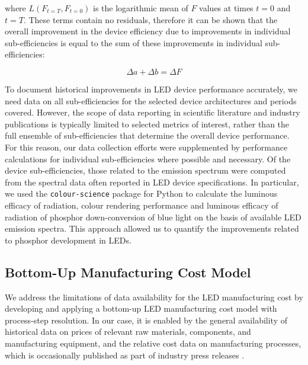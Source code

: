 \documentclass[journal=jacsat,manuscript=article]{achemso}
\begin{document}
where $L(F_{t=T}, F_{t=0})$ is the logarithmic mean of $F$ values at times $t=0$ and $t=T$. These terms contain no residuals, therefore it can be shown that the overall improvement in the device efficiency due to improvements in individual sub-efficiencies is equal to the sum of these improvements in individual sub-efficiencies: 

\begin{equation}
    \Delta a + \Delta b  = \Delta F
\end{equation}

To document historical improvements in LED device performance accurately, we need data on all sub-efficiencies for the selected device architectures and periods covered. However, the scope of data reporting in scientific literature and industry publications is typically limited to selected metrics of interest, rather than the full ensemble of sub-efficiencies that determine the overall device performance. For this reason, our data collection efforts were supplemented by performance calculations for individual sub-efficiencies where possible and necessary. Of the device sub-efficiencies, those related to the emission spectrum  were computed from the spectral data often reported in LED device specifications. In particular, we used the \texttt{colour-science} package for Python\cite{python-colour} to calculate the luminous efficacy of radiation, colour rendering performance and luminous efficacy of radiation of phosphor down-conversion of blue light on the basis of available LED emission spectra. This approach allowed us to  quantify the improvements related to phosphor development in LEDs. 

\subsection{Bottom-Up Manufacturing Cost Model}
\label{sec:costmodel}

We address the limitations of data availability for the LED manufacturing cost by developing and applying a bottom-up LED manufacturing cost model with process-step resolution. In our case, it is enabled by the general availability of historical data on prices of relevant raw materials, components, and manufacturing equipment, and the relative cost data on manufacturing processes, which is occasionally published as part of industry press releases \cite{ledinside2013csp}\cite{seoul2015csp}. 
\end{document}
